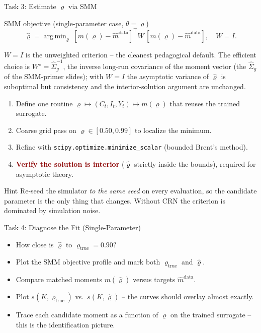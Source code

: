 \documentclass[10pt,aspectratio=169]{beamer}
\newcommand{\emphc}[1]{\textbf{\textcolor{darkred}{#1}}}
\DeclareMathOperator*{\argmin}{arg\,min}
\begin{document}
\begin{frame}{Task 3: Estimate $\varrho$ via SMM}
\begin{block}{SMM objective (single-parameter case, $\theta = \varrho$)}
\vspace{-4pt}
\[\hat\varrho = \argmin_{\varrho}\; [m(\varrho) - \hat{m}^{\mathrm{data}}]^\top W \,[m(\varrho) - \hat{m}^{\mathrm{data}}], \quad W = I.\]
\vspace{-8pt}

{\scriptsize $W = I$ is the unweighted criterion -- the cleanest pedagogical default. The efficient choice is $W^\star = \widehat\Sigma_g^{-1}$, the inverse long-run covariance of the moment vector (the $\widehat\Sigma_g$ of the SMM-primer slides); with $W = I$ the asymptotic variance of $\hat\varrho$ is suboptimal but consistency and the interior-solution argument are unchanged.}
\end{block}
\begin{enumerate}
  \item Define one routine $\varrho \mapsto (C_t, I_t, Y_t) \mapsto m(\varrho)$ that reuses the trained surrogate.
  \item Coarse grid pass on $\varrho \in [0.50, 0.99]$ to localize the minimum.
  \item Refine with \texttt{scipy.optimize.minimize\_scalar} (bounded Brent's method).
  \item \emphc{Verify the solution is interior} ($\hat\varrho$ strictly inside the bounds), required for asymptotic theory.
\end{enumerate}
\begin{alertblock}{Hint}
Re-seed the simulator \emph{to the same seed} on every evaluation, so the candidate parameter is the only thing that changes. Without CRN the criterion is dominated by simulation noise.
\end{alertblock}
\end{frame}

\begin{frame}{Task 4: Diagnose the Fit (Single-Parameter)}
\begin{itemize}
  \item How close is $\hat\varrho$ to $\varrho_{\text{true}} = 0.90$?
  \item Plot the SMM objective profile and mark both $\varrho_{\text{true}}$ and $\hat\varrho$.
  \item Compare matched moments $m(\hat\varrho)$ versus targets $\hat{m}^{\mathrm{data}}$.
  \item Plot $s(K, \varrho_{\text{true}})$ vs.\ $s(K, \hat\varrho)$ -- the curves should overlay almost exactly.
  \item Trace each candidate moment as a function of $\varrho$ on the trained surrogate -- this is the identification picture.
\end{itemize}
\end{frame}
\end{document}
